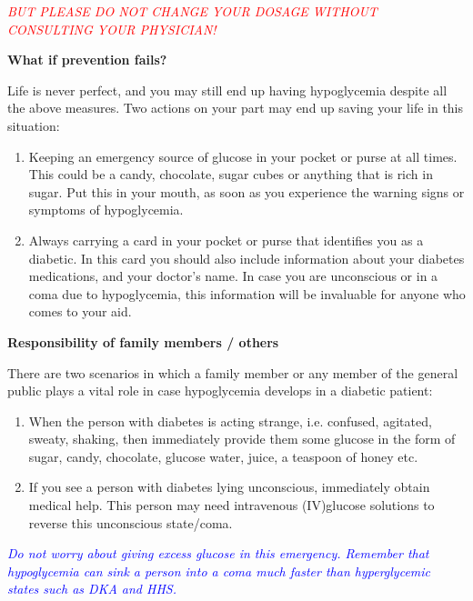 \textcolor{red}{\textit{BUT PLEASE DO NOT CHANGE YOUR DOSAGE WITHOUT CONSULTING YOUR PHYSICIAN!}}

\noindent\textbf{What if prevention fails?}

Life is never perfect, and you may still end up having hypoglycemia despite all the above measures. Two actions on your part may end up saving your life in this situation:

\vspace{-\topsep}
\begin{enumerate}
\itemsep=0pt
\item Keeping an emergency source of glucose in your pocket or purse at all times. This could be a candy, chocolate, sugar cubes or anything that is rich in sugar. Put this in your mouth, as soon as you experience the warning signs or symptoms of hypoglycemia.
\item Always carrying a card in your pocket or purse that identifies you as a diabetic. In this card you should also include information about your diabetes medications, and your doctor’s name. In case you are unconscious or in a coma due to hypoglycemia, this information will be invaluable for anyone who comes to your aid.
\end{enumerate}

\noindent\textbf{Responsibility of family members / others}

There are two scenarios in which a family member or any member of the general public plays a vital role in case hypoglycemia develops in a diabetic patient:

\vspace{-\topsep}
\begin{enumerate}
\itemsep=0pt
\item When the person with diabetes is acting strange, i.e. confused, agitated, sweaty, shaking, then immediately provide them some glucose in the form of sugar, candy, chocolate, glucose water, juice, a teaspoon of honey etc.
\item If you see a person with diabetes lying unconscious, imme\-diately obtain medical help. This person may need intravenous (IV)\break glucose solutions to reverse this unconscious state/coma.
\end{enumerate}
\vspace{-\topsep}

\textcolor{blue}{\textit{Do not worry about giving excess glucose in this emergency. Remember that hypoglycemia can sink a person into a coma much faster than hyperglycemic states such as DKA and HHS.}}

